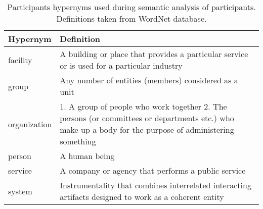 \begin{table}[h]
	\begin{tabular}{|p{0.2 \hsize}|p{0.8 \hsize}|}
		\hline
		Hypernym & Definition\\
		\hline
		\hline
		facility & A building or place that provides a particular service or is used for a particular industry\\
		\hline
		group & Any number of entities (members) considered as a unit\\
		\hline
		organization & 1. A group of people who work together 2. The persons (or committees or departments etc.) who make up a body for the purpose of administering something\\
		\hline
		person & A human being\\
		\hline
		service & A company or agency that performs a public service\\
		\hline
		system & Instrumentality that combines interrelated interacting artifacts designed to work as a coherent entity\\
		\hline
	\end{tabular}
	\caption{Participants hypernyms used during semantic analysis of participants. Definitions taken from WordNet database.}
	\label{table:participants-hypernyms}
\end{table}

\begin{table}[h]
	\centering
\end{table}